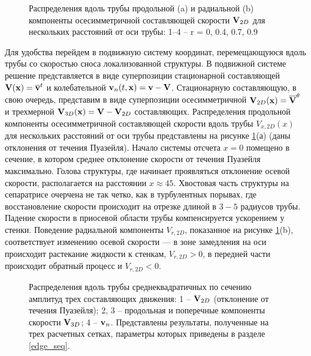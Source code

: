 \begin{figure}
\caption{Распределения вдоль трубы продольной (a) и радиальной (b) компоненты осесимметричной составляющей скорости $\mathbf{V}_{2D}$ для нескольких расстояний от оси трубы: 1–4 – r = 0, 0.4, 0.7, 0.9}
\label{U2D_pic}
\end{figure}

Для удобства перейдем в подвижную систему координат, перемещающуюся вдоль трубы со скоростью сноса локализованной структуры. В подвижной системе решение представляется в виде суперпозиции стационарной составляющей $\mathbf{V}(\mathbf{x}) = \overline{\mathbf{v}}^t$ и колебательной $\mathbf{v}_n(t,\mathbf{x}) = \mathbf{v} - \mathbf{V}$. Стационарную составляющую, в свою очередь, представим в виде суперпозиции осесимметричной $\mathbf{V}_{2D}(\mathbf{x}) = \overline{\mathbf{V}}^{\theta}$ и трехмерной $\mathbf{V}_{3D}(\mathbf{x}) = \mathbf{V} - \mathbf{V}_{2D}$ составляющих. Распределения продольной компоненты осесимметричной составляющей скорости вдоль трубы $V_{x,2D}(x)$ для нескольких расстояний от оси трубы представлены на рисунке \ref{U2D_pic}(а) (даны отклонения от течения Пуазейля). Начало системы отсчета $x=0$ помещено в сечение, в котором среднее отклонение скорости от течения Пуазейля максимально. Голова структуры, где начинает проявляться отклонение осевой скорости, располагается на расстоянии $x \approx 45$. Хвостовая часть структуры на сепаратрисе очерчена не так четко, как в турбулентных порывах, где восстановление скорости происходит на отрезке длиной в $3-5$ радиусов трубы.  Падение скорости в приосевой области трубы компенсируется ускорением у стенки. Поведение радиальной компоненты $V_{r,2D}$, показанное на рисунке \ref{U2D_pic}(b), соответствует изменению осевой скорости --- в зоне замедления на оси происходит растекание жидкости к стенкам, $V_{r,2D}>0$, в передней части происходит обратный процесс и $V_{r,2D}<0$.

\begin{figure}
\caption{Распределения вдоль трубы среднеквадратичных по сечению амплитуд трех составляющих движения: 1 -- $\mathbf{V}_{2D}$ (отклонение от течения Пуазейля); 2, 3 -- продольная и поперечные компоненты скорости $\mathbf{V}_{3D}$; 4 -- $\mathbf{v}_{n}$. Представлены результаты, полученные на трех расчетных сетках, параметры которых приведены в разделе \ref{edge_seq}. }
\label{amp_pic}
\end{figure}

